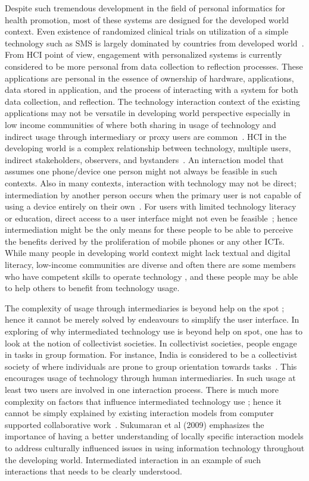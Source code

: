 Despite such tremendous development in the field of personal informatics for health promotion, most of these systems are designed for the developed world context. Even existence of randomized clinical trials on utilization of a simple technology such as SMS is largely dominated by countries from developed world~\citep{cole2010text}. From HCI point of view, engagement with personalized systems is currently considered to be more personal from data collection to reflection processes. These applications are personal in the essence of ownership of hardware, applications, data stored in application, and the process of interacting with a system for both data collection, and reflection. The technology interaction context of the existing applications may not be versatile in developing world perspective especially in low income communities of where  both sharing in usage of technology and indirect usage through intermediary or proxy users are common~\citep{kaplan2006can,sambasivan2010}. HCI in the developing world is a complex relationship between technology, multiple users, indirect stakeholders, observers, and bystanders~\citep{parikh2006}. An interaction model that assumes one phone/device one person might not always be feasible in such contexts. Also in many contexts, interaction with technology may not be direct; intermediation by another person occurs when the primary user is not capable of using a device entirely on their own~\citep{sambasivan2010}. For users with limited technology literacy or education, direct access to a user interface might not even be feasible~\citep{parikh2006}; hence intermediation might be the only means for these people to be able to perceive the benefits derived by the proliferation of mobile phones or any other ICTs. While many people in developing world context might lack textual and digital literacy, low-income communities are diverse and often there are some members who have competent skills to operate technology \citep{sambasivan2010}, and these people may be able to help others to benefit from technology usage.

The complexity of usage through intermediaries is beyond help on the spot \citep{sambasivan2010}; hence it cannot be merely solved by endeavours to simplify the user interface. In exploring of why intermediated technology use is beyond help on spot, one has to look at the notion of collectivist societies. In collectivist societies, people engage in tasks in group formation. For instance, India is considered to be a collectivist society of where individuals are prone to group orientation towards tasks~\citep{parikh2006}. This encourages usage of technology through human intermediaries. In such usage at least two users are involved in one interaction process. There is much more complexity on factors that influence intermediated technology use ; hence it cannot be simply explained by existing interaction models from computer supported collaborative work~\citep{parikh2006}. Sukumaran et al (2009) emphasizes the importance of having a better understanding of locally specific interaction models to address culturally influenced issues in using information technology throughout the developing world. Intermediated interaction in an example of such interactions that needs to be clearly understood.

